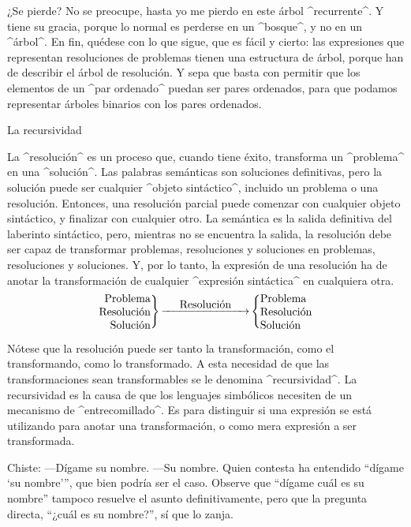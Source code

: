¿Se pierde? No se preocupe, hasta yo me pierdo en este árbol
^recurrente^. Y tiene su gracia, porque lo normal es perderse en un
^bosque^, y no en un ^árbol^. En fin, quédese con lo que sigue, que es
fácil y cierto: las expresiones que representan resoluciones de
problemas tienen una estructura de árbol, porque han de describir el
árbol de resolución. Y sepa que basta con permitir que los elementos de
un ^par ordenado^ puedan ser pares ordenados, para que podamos
representar árboles binarios con los pares ordenados.


\Section La recursividad

La ^resolución^ es un proceso que, cuando tiene éxito, transforma un
^problema^ en una ^solución^. Las palabras semánticas son soluciones
definitivas, pero la solución puede ser cualquier ^objeto sintáctico^,
incluido un problema o una resolución. Entonces, una resolución parcial
puede comenzar con cualquier objeto sintáctico, y finalizar con
cualquier otro. La semántica es la salida definitiva del laberinto
sintáctico, pero, mientras no se encuentra la salida, la resolución debe
ser capaz de transformar problemas, resoluciones y soluciones en
problemas, resoluciones y soluciones. Y, por lo tanto, la expresión de
una resolución ha de anotar la transformación de cualquier ^expresión
sintáctica^ en cualquiera otra.
$$\left.\vcenter{\halign{\hfil\rm#\crcr
 Problema\cr Resolución\cr Solución\cr}}\right\}
 \mathop{\hbox to 80pt{\rightarrowfill}}\limits^{\hbox{\rm Resolución}}
 \left\{\vcenter{\halign{\rm#\hfil\crcr
 Problema\cr Resolución\cr Solución\cr}}\right.
$$

Nótese que la resolución puede ser tanto la transformación, como el
transformando, como lo transformado. A esta necesidad de que las
transformaciones sean transformables se le denomina ^recursividad^. La
recursividad es la causa de que los lenguajes simbólicos necesiten de un
mecanismo de ^entrecomillado^. Es para distinguir si una expresión se
está utilizando para anotar una transformación, o como mera expresión a
ser transformada.

 Chiste:\newline
 ---Dígame su nombre.\newline
 ---Su nombre.\newline
Quien contesta ha entendido ``dígame `su nombre'\thinspace'', que bien
podría ser el caso. Observe que ``dígame cuál es su nombre'' tampoco
resuelve el asunto definitivamente, pero que la pregunta directa,
``¿cuál es su nombre?'', sí que lo zanja.

